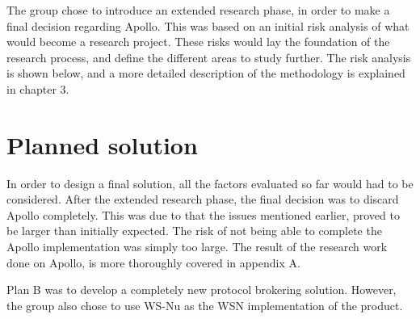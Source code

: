 The group chose to introduce an extended research phase, in order to make a final decision regarding Apollo. This was based on an initial risk analysis of what would become a research project. These risks would lay the foundation of the research process, and define the different areas to study further. The risk analysis is shown below, and a more detailed description of the methodology is explained in chapter 3.

\begin{table}[h]
\centering
{}
\caption{Risk analysis for Apollo}
\label{fig:risk_analysis_apollo}
\end{table}

\section{Planned solution}

In order to design a final solution, all the factors evaluated so far would had to be considered. After the extended research phase, the final decision was to discard Apollo completely. This was due to that the issues mentioned earlier, proved to be larger than initially expected. The risk of not being able to complete the Apollo implementation was simply too large. The result of the research work done on Apollo, is more thoroughly covered in appendix A.

Plan B was to develop a completely new protocol brokering solution. However, the group also chose to use WS-Nu as the WSN implementation of the product. 


